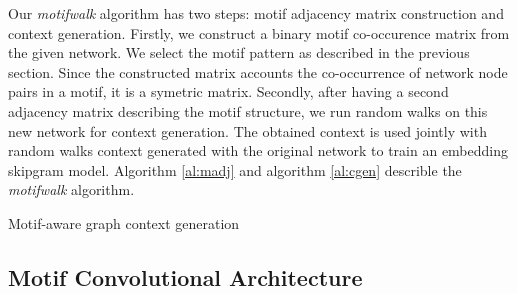 \documentclass{article}
\theoremstyle{definition}
\begin{document}
Our \emph{motifwalk} algorithm has two steps: motif adjacency matrix
construction and context generation. Firstly, we construct a binary
motif co-occurence matrix from the given network. We select the motif
pattern as described in the previous section. Since the constructed matrix 
accounts the co-occurrence of network node pairs in a motif, it is a symetric
matrix. Secondly, after having a second adjacency matrix describing the
motif structure, we run random walks on this new network for context generation. 
The obtained context is used jointly with random walks context generated with 
the original network to train an embedding skipgram model. Algorithm \ref{al:madj}
and algorithm \ref{al:cgen} describle the \emph{motifwalk} algorithm.
\begin{algorithm}[h] \label{al:cgen}
\caption{Motif-aware graph context generation}
\end{algorithm}

\subsection{Motif Convolutional Architecture}
\end{document}
